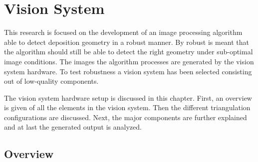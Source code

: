 \chapter{Vision System}\label{ch:hardware}
\raggedbottom
This research is focused on the development of an image processing algorithm able to detect deposition geometry in a robust manner. By robust is meant that the algorithm should still be able to detect the right geometry under sub-optimal image conditions. The images the algorithm processes are generated by the vision system hardware. To test robustness a vision system has been selected consisting out of low-quality components.  

The vision system hardware setup is discussed in this chapter. First, an overview is given of all the elements in the vision system. Then the different triangulation configurations are discussed. Next, the major components are further explained and at last the generated output is analyzed. 

\section{Overview}

